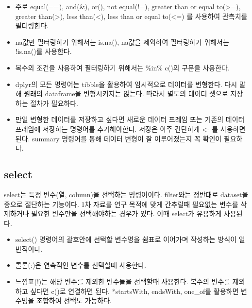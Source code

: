 \documentclass[
]{book}
\newenvironment{Shaded}{\begin{snugshade}}{\end{snugshade}}
\newcommand{\DecValTok}[1]{\textcolor[rgb]{0.00,0.00,0.81}{#1}}
\newcommand{\FunctionTok}[1]{\textcolor[rgb]{0.00,0.00,0.00}{#1}}
\newcommand{\NormalTok}[1]{#1}
\newcommand{\OtherTok}[1]{\textcolor[rgb]{0.56,0.35,0.01}{#1}}
\newcommand{\SpecialCharTok}[1]{\textcolor[rgb]{0.00,0.00,0.00}{#1}}
\providecommand{\tightlist}{%
  \setlength{\itemsep}{0pt}\setlength{\parskip}{0pt}}
\theoremstyle{definition}
\theoremstyle{definition}
\theoremstyle{definition}
\theoremstyle{definition}
\theoremstyle{remark}
\begin{document}
\begin{itemize}
\tightlist
\item
  주로 equal(==), and(\&), or(\textbar), not equal(!=), greater than or equal to(\textgreater=), greater than(\textgreater), less than(\textless), less than or equal to(\textless=) 를 사용하여 관측치를 필터링한다.
\item
  na값만 필터링하기 위해서는 is.na(), na값을 제외하여 필터링하기 위해서는 !is.na()를 사용한다.
\item
  복수의 조건을 사용하여 필터링하기 위해서는 \%in\% c()의 구문을 사용한다.
\item
  dplyr의 모든 명령어는 tibble을 활용하여 임시적으로 데이터를 변형한다. 다시 말해 원래의 dataframe을 변형시키지는 않는다. 따라서 별도의 데이터 셋으로 저장하는 절차가 필요하다.
\item
  만일 변형한 데이터를 저장하고 싶다면 새로운 데이터 프레임 또는 기존의 데이터 프레임에 저장하는 명령어를 추가해야한다. 저장은 아주 간단하게 \textless- 를 사용하면된다. summary 명령어를 통해 데이터 변형이 잘 이루어졌는지 꼭 확인이 필요하다.
\end{itemize}

\begin{Shaded}
\end{Shaded}

\hypertarget{select}{%
\subsection{select}\label{select}}

select는 특정 변수(열, column)을 선택하는 명령어이다. filter와는 정반대로 dataset을 종으로 절단하는 기능이다. 1차 자료를 연구 목적에 맞게 간추릴때 필요없는 변수를 삭제하거나 필요한 변수만을 선택해야하는 경우가 있다. 이때 select가 유용하게 사용된다.

\begin{itemize}
\tightlist
\item
  select() 명령어의 괄호안에 선택할 변수명을 쉼표로 이어가며 작성하는 방식이 일반적이다.
\item
  콜론(:)은 연속적인 변수를 선택할때 사용한다.
\item
  느낌표(!)는 해당 변수를 제외한 변수들을 선택할때 사용한다. 복수의 변수를 제외하고 싶다면 c()로 연결하면 된다.
  *startsWith, endsWith, one\_of를 활용하면 변수명을 조합하여 선택도 가능하다.
\end{itemize}
\end{document}
